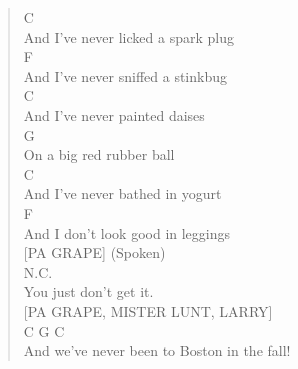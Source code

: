 \documentclass[11pt]{article}
\begin{document}
\begin{verse}
\hspace*{9em}C\\
And I've never licked a spark plug\\
\hspace*{9em}F\\
And I've never sniffed a stinkbug\\
\hspace*{9em}C\\
And I've never painted daises\\
\hspace*{5em}G\\
On a big red rubber ball\\
\hspace*{4em}C\\
And I've never bathed in yogurt\\
\hspace*{6em}F\\
And I don't look good in leggings\\
\vspace*{1em}
\vspace*{1em}
[PA GRAPE] (Spoken)\\
N.C.\\
You just don't get it.\\
\vspace*{1em}
\vspace*{1em}
[PA GRAPE, MISTER LUNT, LARRY]\\
\hspace*{10em}C             G             C\\
And we've never been to Boston in the fall!\\
\end{verse}
\clearpage
\end{document}
